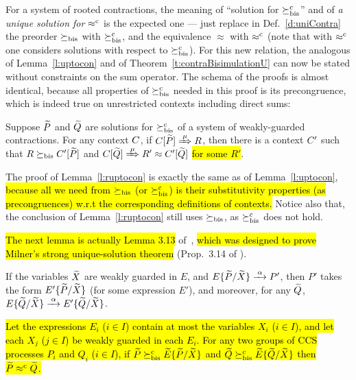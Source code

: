 For a system of rooted contractions, the meaning of 
``solution for $\mathrel{\succeq^{\rm{c}}_{\rm{bis}}}$'' and of \emph{a unique solution for $\mathrel{\approx^{\rm{c}}}$}
is the expected one --- just replace in Def.~\ref{d:uniContra}  the preorder 
$\mathrel{\succeq_{\rm{bis}}}$ with $\mathrel{\succeq^{\rm{c}}_{\rm{bis}}}$, and the equivalence 
$\approx$ with $\mathrel{\approx^{\rm{c}}}$ (note that with $\mathrel{\approx^{\rm{c}}}$ one considers
solutions with respect to  $\mathrel{\succeq^{\rm{c}}_{\rm{bis}}}$).
%
For this new relation, the analogous of Lemma~\ref{l:uptocon} and of
Theorem~\ref{t:contraBisimulationU} can now be stated without constraints on the sum
operator.
The schema of the proofs is almost identical, because all 
properties of $\mathrel{\succeq^{\rm{c}}_{\rm{bis}}}$ needed in this proof is its precongruence, which is
indeed true on unrestricted contexts including direct sums:
\begin{lemma}
\label{l:ruptocon}
Suppose $\widetilde P$ and $\widetilde Q$ are solutions  for $\mathrel{\succeq^{\rm{c}}_{\rm{bis}}}$ 
 of a system of weakly-guarded
contractions.
For any context $C$, 
if  $\ct{\til P}\Arr{\mu}  R$,
 then 
there is a  context $C'$
such that $R \mathrel{\succeq_{\rm{bis}}} C' [\widetilde P]$ and  $\ct{\til Q} \Arr{\mu} R'
 \wb \ctp{\til Q}$ \hl{for some $R'$}.
\end{lemma}
The proof of Lemma~\ref{l:ruptocon} is exactly the same as of
Lemma~\ref{l:uptocon}, \hl{because all we need from $\mathrel{\succeq_{\rm{bis}}}$ (or
$\mathrel{\succeq^{\rm{c}}_{\rm{bis}}}$) is their substitutivity properties (as precongruences)
w.r.t the corresponding definitions of contexts.}
Notice also that, the conclusion of
Lemma~\ref{l:ruptocon} still uses $\mathrel{\succeq_{\rm{bis}}}$, as $\mathrel{\succeq^{\rm{c}}_{\rm{bis}}}$ does
not hold.

\hl{The next lemma is actually Lemma 3.13} of~\citep[p.~102]{Mil89}, \hl{which
was designed to prove Milner's strong unique-solution theorem} (Prop.~3.14 of
\citep[p.~103]{Mil89}).
\begin{lemma}
  \label{lem:milner313}
  If the variables ${\widetilde X}$ are weakly guarded in $E$, and $E\{\til
  P/\til X\} \arr{\alpha} P'$, then $P'$ takes the form $E'\{\widetilde
  P/\widetilde X\}$ (for some expression $E'$), and moreover, for any ${\widetilde Q}$,
  $E\{\til Q/\til X\} \arr{\alpha} E'\{\til Q/\til X\}$.
\end{lemma}

\begin{theorem}
\label{t:rcontraBisimulationU}
\hl{Let the expressions $E_i$ ($i \in I$) contain at most the
  variables $X_i$ ($i \in I$), and let each $X_j$ ($j\in I$) be weakly
  guarded in each $E_i$. For any two groups of CCS processes $P_i$ and
  $Q_i$ ($i \in I$), if $\widetilde P \mathrel{\succeq^{\rm{c}}_{\rm{bis}}} \widetilde E\{\widetilde P/\widetilde X\}$ and
    $\widetilde Q \mathrel{\succeq^{\rm{c}}_{\rm{bis}}} \widetilde E\{\widetilde Q/\widetilde X\}$ then $\widetilde P \mathrel{\approx^{\rm{c}}} \widetilde Q$.}
\end{theorem}

